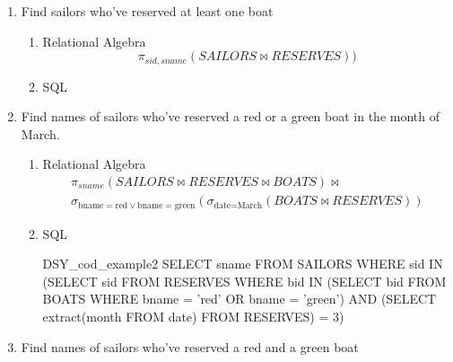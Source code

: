 \begin{enumerate}
    \item  Find sailors who've reserved at least one boat
          \begin{enumerate}
              \item Relational Algebra
                    \begin{equation*}
                        \pi_{sid, sname}(SAILORS \bowtie RESERVES))
                    \end{equation*}

              \item  SQL \linebreak {}
          \end{enumerate}
          \vspace{1cm}

    \item Find names of sailors who've reserved a red or a green boat in the month of March.
          \begin{enumerate}
              \item Relational Algebra
                    \begin{multline*}
                        \pi_{sname}(SAILORS \bowtie RESERVES \bowtie BOATS) \bowtie \\
                        \sigma_{\text{bname} = \text{red} \lor \text{bname} = \text{green}}(\sigma_{\text{date} = \text{March}}(BOATS \bowtie RESERVES))
                    \end{multline*}

              \item  SQL
                    \begin{sqlQuery}{DSY_cod_example2}
                            SELECT sname
                            FROM SAILORS
                            WHERE sid IN
                                (SELECT sid
                                FROM RESERVES
                                WHERE bid IN
                                    (SELECT bid
                                    FROM BOATS
                                    WHERE bname = 'red' OR bname = 'green')
                                AND (SELECT extract(month FROM date) FROM RESERVES) = 3)
                    \end{sqlQuery}

          \end{enumerate}

    \item  Find names of sailors who've reserved a red and a green boat


\end{enumerate}

